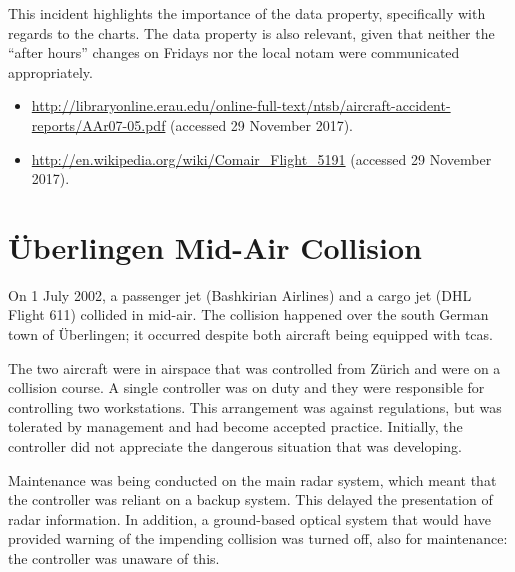 This incident highlights the importance of the  \gls{data property}, specifically with regards to the charts. The  \gls{data property} is also relevant, given that neither the ``after hours'' changes on Fridays nor the local \gls{notam} were communicated appropriately.

\begin{samepage}
\begin{itemize}
  \item \raggedright{\href{http://libraryonline.erau.edu/online-full-text/ntsb/aircraft-accident-reports/AAr07-05.pdf}{http://libraryonline.erau.edu/online-full-text/ntsb/aircraft-accident-reports/AAr07-05.pdf} (accessed 29 November 2017).}
	\item \raggedright{\href{http://en.wikipedia.org/wiki/Comair_Flight_5191}{http://en.wikipedia.org/wiki/Comair\_Flight\_5191} (accessed 29 November 2017).}
\end{itemize}
\end{samepage}


\section{\"Uberlingen Mid-Air Collision} \label{bkm:incacc:uberlingen}
On 1 July 2002, a passenger jet (Bashkirian Airlines) and a cargo jet (DHL Flight 611) collided in mid-air. The collision happened over the south German town of \"Uberlingen; it occurred despite both aircraft being equipped with \gls{tcas}.

The two aircraft were in airspace that was controlled from Z\"urich and were on a collision course. A single controller was on duty and they were responsible for controlling two workstations. This arrangement was against regulations, but was tolerated by management and had become accepted practice. Initially, the controller did not appreciate the dangerous situation that was developing.

Maintenance was being conducted on the main radar system, which meant that the controller was reliant on a backup system. This delayed the presentation of radar \gls{information}. In addition, a ground-based optical system that would have provided warning of the impending collision was turned off, also for maintenance: the controller was unaware of this.

